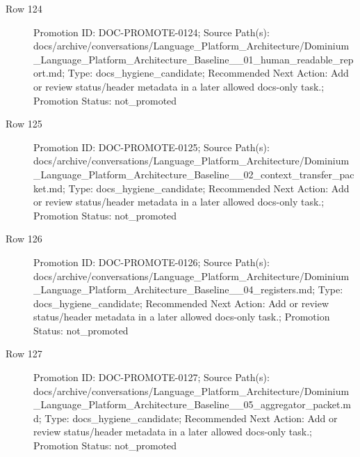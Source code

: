 \documentclass[9pt,a4paper,openany]{book}
\begin{document}
\begin{description}
\item[Row 124] Promotion ID: DOC-\allowbreak{}PROMOTE-\allowbreak{}0124; Source Path(s): docs/\allowbreak{}archive/\allowbreak{}conversations/\allowbreak{}Language\_\allowbreak{}Platform\_\allowbreak{}Architecture/\allowbreak{}Dominium\_\allowbreak{}Language\_\allowbreak{}Platform\_\allowbreak{}Architecture\_\allowbreak{}Baseline\_\allowbreak{}\_\allowbreak{}01\_\allowbreak{}human\_\allowbreak{}readable\_\allowbreak{}report.\allowbreak{}md; Type: docs\_\allowbreak{}hygiene\_\allowbreak{}candidate; Recommended Next Action: Add or review status/\allowbreak{}header metadata in a later allowed docs-\allowbreak{}only task.\allowbreak{}; Promotion Status: not\_\allowbreak{}promoted
\item[Row 125] Promotion ID: DOC-\allowbreak{}PROMOTE-\allowbreak{}0125; Source Path(s): docs/\allowbreak{}archive/\allowbreak{}conversations/\allowbreak{}Language\_\allowbreak{}Platform\_\allowbreak{}Architecture/\allowbreak{}Dominium\_\allowbreak{}Language\_\allowbreak{}Platform\_\allowbreak{}Architecture\_\allowbreak{}Baseline\_\allowbreak{}\_\allowbreak{}02\_\allowbreak{}context\_\allowbreak{}transfer\_\allowbreak{}packet.\allowbreak{}md; Type: docs\_\allowbreak{}hygiene\_\allowbreak{}candidate; Recommended Next Action: Add or review status/\allowbreak{}header metadata in a later allowed docs-\allowbreak{}only task.\allowbreak{}; Promotion Status: not\_\allowbreak{}promoted
\item[Row 126] Promotion ID: DOC-\allowbreak{}PROMOTE-\allowbreak{}0126; Source Path(s): docs/\allowbreak{}archive/\allowbreak{}conversations/\allowbreak{}Language\_\allowbreak{}Platform\_\allowbreak{}Architecture/\allowbreak{}Dominium\_\allowbreak{}Language\_\allowbreak{}Platform\_\allowbreak{}Architecture\_\allowbreak{}Baseline\_\allowbreak{}\_\allowbreak{}04\_\allowbreak{}registers.\allowbreak{}md; Type: docs\_\allowbreak{}hygiene\_\allowbreak{}candidate; Recommended Next Action: Add or review status/\allowbreak{}header metadata in a later allowed docs-\allowbreak{}only task.\allowbreak{}; Promotion Status: not\_\allowbreak{}promoted
\item[Row 127] Promotion ID: DOC-\allowbreak{}PROMOTE-\allowbreak{}0127; Source Path(s): docs/\allowbreak{}archive/\allowbreak{}conversations/\allowbreak{}Language\_\allowbreak{}Platform\_\allowbreak{}Architecture/\allowbreak{}Dominium\_\allowbreak{}Language\_\allowbreak{}Platform\_\allowbreak{}Architecture\_\allowbreak{}Baseline\_\allowbreak{}\_\allowbreak{}05\_\allowbreak{}aggregator\_\allowbreak{}packet.\allowbreak{}md; Type: docs\_\allowbreak{}hygiene\_\allowbreak{}candidate; Recommended Next Action: Add or review status/\allowbreak{}header metadata in a later allowed docs-\allowbreak{}only task.\allowbreak{}; Promotion Status: not\_\allowbreak{}promoted

\end{description}
\end{document}
